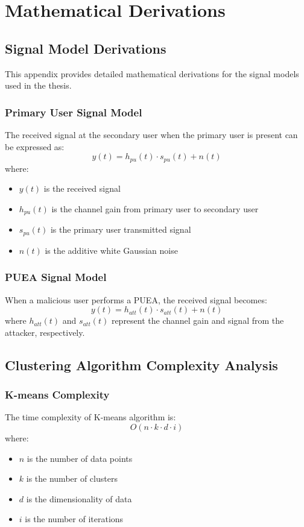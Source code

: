 \chapter{Mathematical Derivations}
\label{app:math}

\section{Signal Model Derivations}
\label{app:signal_model}

This appendix provides detailed mathematical derivations for the signal models used in the thesis.

\subsection{Primary User Signal Model}
The received signal at the secondary user when the primary user is present can be expressed as:
\begin{equation}
y(t) = h_{pu}(t) \cdot s_{pu}(t) + n(t)
\end{equation}
where:
\begin{itemize}
    \item $y(t)$ is the received signal
    \item $h_{pu}(t)$ is the channel gain from primary user to secondary user
    \item $s_{pu}(t)$ is the primary user transmitted signal
    \item $n(t)$ is the additive white Gaussian noise
\end{itemize}

\subsection{PUEA Signal Model}
When a malicious user performs a PUEA, the received signal becomes:
\begin{equation}
y(t) = h_{att}(t) \cdot s_{att}(t) + n(t)
\end{equation}
where $h_{att}(t)$ and $s_{att}(t)$ represent the channel gain and signal from the attacker, respectively.

\section{Clustering Algorithm Complexity Analysis}
\label{app:complexity}

\subsection{K-means Complexity}
The time complexity of K-means algorithm is:
\begin{equation}
O(n \cdot k \cdot d \cdot i)
\end{equation}
where:
\begin{itemize}
    \item $n$ is the number of data points
    \item $k$ is the number of clusters
    \item $d$ is the dimensionality of data
    \item $i$ is the number of iterations
\end{itemize}

